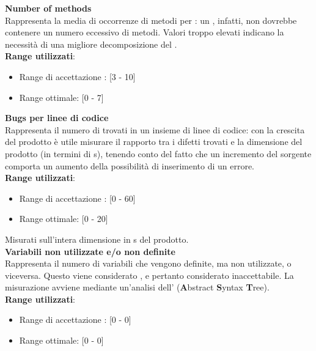 \textbf{Number of methods}\\

Rappresenta la media di occorrenze di metodi per : un , infatti, non dovrebbe contenere un numero eccessivo di metodi. Valori troppo elevati indicano la necessità di una migliore decomposizione del . \\

\textbf{Range utilizzati}:
\begin{itemize}
	\item Range di accettazione : [3 - 10]
	\item Range ottimale: [0 - 7]
\end{itemize}

\textbf{Bugs per linee di codice}\\

Rappresenta il numero di  trovati in un insieme di linee di codice: con la crescita del prodotto è utile misurare il rapporto tra i difetti trovati e la dimensione del prodotto (in termini di s), tenendo conto del fatto che un incremento del sorgente comporta un aumento della possibilità di inserimento di un errore. \\

\textbf{Range utilizzati}:
\begin{itemize}
	\item Range di accettazione : [0 - 60]
	\item Range ottimale: [0 - 20]
\end{itemize}
Misurati sull'intera dimensione in s del prodotto.\\

\textbf{Variabili non utilizzate e/o non definite}\\

Rappresenta il numero di variabili che vengono definite, ma non utilizzate, o viceversa. Questo viene considerato , e pertanto considerato inaccettabile. La misurazione avviene mediante un'analisi dell'\textbf{} (\textbf{A}bstract \textbf{S}yntax \textbf{T}ree). \\

\textbf{Range utilizzati}:
\begin{itemize}
	\item Range di accettazione : [0 - 0]
	\item Range ottimale: [0 - 0]
\end{itemize}


